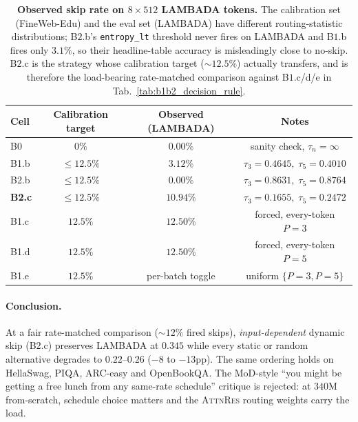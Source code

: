 \documentclass{article}
\newcommand{\attnres}{\textsc{AttnRes}}
\begin{document}
\begin{table}[h]
\caption{\textbf{Observed skip rate on $8\times512$ LAMBADA tokens.} The calibration set (FineWeb-Edu) and the eval set (LAMBADA) have different routing-statistic distributions; B$2.$b's \texttt{entropy\_lt} threshold never fires on LAMBADA and B$1.$b fires only $3.1\%$, so their headline-table accuracy is misleadingly close to no-skip. B$2.$c is the strategy whose calibration target ($\sim$$12.5\%$) actually transfers, and is therefore the load-bearing rate-matched comparison against B$1.$c/d/e in Tab.~\ref{tab:b1b2_decision_rule}.}
\label{tab:b1b2_observed_rate}
\centering\small
\begin{tabular}{lccc}
\toprule
Cell & Calibration target & Observed (LAMBADA) & Notes \\
\midrule
B0  & $0\%$        & $0.00\%$  & sanity check, $\tau_n{=}\infty$ \\
B1.b & $\le 12.5\%$ & $3.12\%$  & $\tau_3{=}0.4645,\;\tau_5{=}0.4010$ \\
B2.b & $\le 12.5\%$ & $0.00\%$  & $\tau_3{=}0.8631,\;\tau_5{=}0.8764$ \\
\textbf{B2.c} & $\le 12.5\%$ & $\mathbf{10.94\%}$ & $\tau_3{=}0.1655,\;\tau_5{=}0.2472$ \\
B1.c & $12.5\%$     & $12.50\%$ & forced, every-token $P{=}3$ \\
B1.d & $12.5\%$     & $12.50\%$ & forced, every-token $P{=}5$ \\
B1.e & $12.5\%$     & per-batch toggle & uniform $\{P{=}3, P{=}5\}$ \\
\bottomrule
\end{tabular}
\end{table}

\paragraph{Conclusion.} At a fair rate-matched comparison ($\sim$$12\%$
fired skips), \emph{input-dependent} dynamic skip (B$2.$c) preserves
LAMBADA at $0.345$ while every static or random alternative degrades
to $0.22$--$0.26$ ($-8$ to $-13$pp). The same ordering holds on
HellaSwag, PIQA, ARC-easy and OpenBookQA. The MoD-style ``you might be
getting a free lunch from any same-rate schedule'' critique is
rejected: at $340$M from-scratch, schedule choice matters and the
\attnres{} routing weights carry the load.
\end{document}
